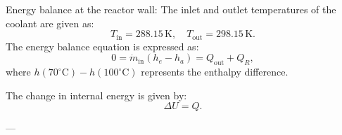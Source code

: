 Energy balance at the reactor wall:  
The inlet and outlet temperatures of the coolant are given as:  
\[
T_{\text{in}} = 288.15 \, \text{K}, \quad T_{\text{out}} = 298.15 \, \text{K}.
\]  
The energy balance equation is expressed as:  
\[
0 = \dot{m}_{\text{in}} \left( h_e - h_a \right) = Q_{\text{out}} + Q_R,
\]  
where \( h(70^\circ\text{C}) - h(100^\circ\text{C}) \) represents the enthalpy difference.  

The change in internal energy is given by:  
\[
\Delta U = Q.
\]  

---